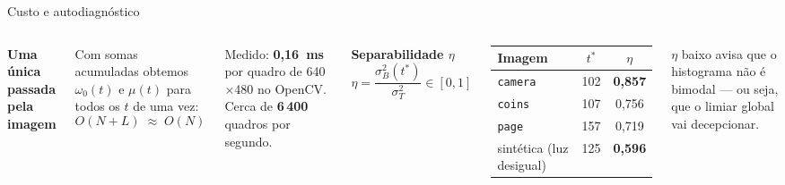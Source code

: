 \documentclass[aspectratio=169,12pt]{beamer}
\newcommand{\num}[1]{\textcolor{brasa}{\textbf{#1}}}
\newcommand{\sub}[1]{{\small\textcolor{cinza}{#1}}}
\begin{document}
\begin{frame}{Custo e autodiagnóstico}

  \begin{columns}[T,onlytextwidth]
      \textbf{Uma única passada pela imagem}

      \vspace{.5em}
      Com somas acumuladas obtemos $\omega_0(t)$ e $\mu(t)$ para todos os $t$ de
      uma vez:
      \[
        O(N+L)\;\approx\;O(N)
      \]

      \vspace{.4em}
      Medido: \num{0,16~ms} por quadro de 640$\times$480 no OpenCV.
      Cerca de \num{6\,400} quadros por segundo.

      \textbf{Separabilidade $\eta$}
      \[
        \eta=\frac{\sigma_B^2(t^{*})}{\sigma_T^2}\in[0,1]
      \]

      \vspace{.3em}
      \footnotesize
      \begin{tabular}{@{}lcc@{}}
        \toprule
        Imagem & $t^{*}$ & $\eta$ \\
        \midrule
        \texttt{camera}    & 102 & \textbf{0,857} \\
        \texttt{coins}     & 107 & 0,756 \\
        \texttt{page}      & 157 & 0,719 \\
        sintética (luz desigual) & 125 & \textbf{0,596} \\
        \bottomrule
      \end{tabular}

      \vspace{.6em}
      \sub{$\eta$ baixo avisa que o histograma não é bimodal — ou seja, que o
      limiar global vai decepcionar.}
  \end{columns}

\end{frame}
\end{document}
